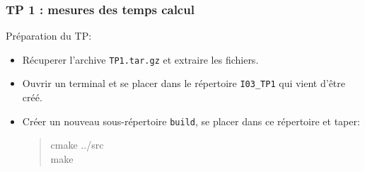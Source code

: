 \documentclass{beamer}
\begin{document}
\begin{frame}
\frametitle{TP 1 : mesures des temps calcul}

Préparation du TP:
\begin{itemize}
	\item Récuperer l'archive {\tt TP1.tar.gz} et extraire les fichiers.
	\item Ouvrir un terminal et se placer dans le répertoire {\tt I03\_TP1} qui vient d'être créé.
	\item Créer un nouveau sous-répertoire {\tt build}, se placer dans ce répertoire et taper:
	\begin{quote}
	cmake ../src\\
	make
	\end{quote} 
\end{itemize}
\end{frame}
\end{document}
